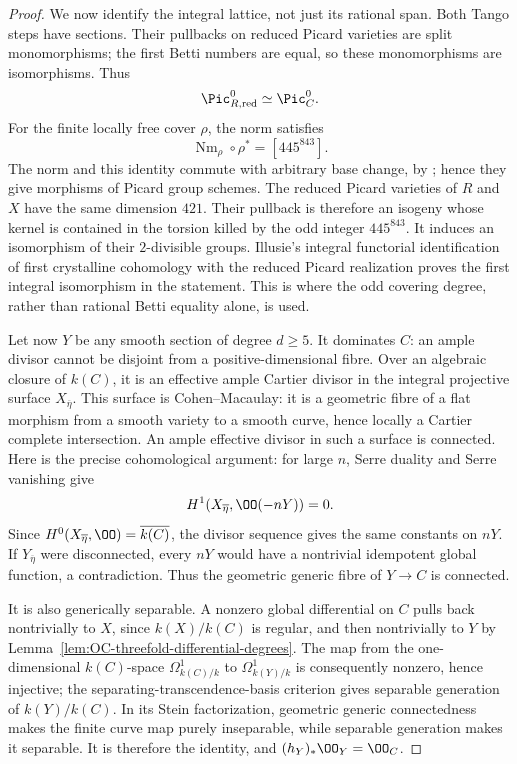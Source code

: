 \begin{proof}
We now identify the integral lattice, not just its rational span.  Both Tango steps have sections.  Their pullbacks on reduced Picard varieties are split monomorphisms; the first Betti numbers are equal, so these monomorphisms are isomorphisms.  Thus
\[
                   \Pic^0_{R,\mathrm{red}}\simeq\Pic^0_C.
\]
For the finite locally free cover $\rho$, the norm satisfies
\[
            \operatorname{Nm}_\rho\circ\rho^*=[445^{843}].
\]
The norm and this identity commute with arbitrary base change, by
\cite[Lemmas~31.18.2 and~31.18.6, Tags~0BCY and~0BD2]{StacksProject}; hence they give morphisms of Picard group schemes.  The reduced Picard varieties of $R$ and $X$ have the same dimension $421$.  Their pullback is therefore an isogeny whose kernel is contained in the torsion killed by the odd integer $445^{843}$.  It induces an isomorphism of their $2$-divisible groups.  Illusie's integral functorial identification of first crystalline cohomology with the reduced Picard realization
\cite[II, Proposition~3.11 and Remark~3.11.2]{Illusie1979DRW}
proves the first integral isomorphism in the statement.  This is where the odd covering degree, rather than rational Betti equality alone, is used.

Let now $Y$ be any smooth section of degree $d\geq5$.  It dominates $C$: an ample divisor cannot be disjoint from a positive-dimensional fibre.  Over an algebraic closure of $k(C)$, it is an effective ample Cartier divisor in the integral projective surface $X_{\overline\eta}$.  This surface is Cohen--Macaulay: it is a geometric fibre of a flat morphism from a smooth variety to a smooth curve, hence locally a Cartier complete intersection.  An ample effective divisor in such a surface is connected.  Here is the precise cohomological argument: for large $n$, Serre duality and Serre vanishing give
\[
               H^1(X_{\overline\eta},\OO(-nY))=0.
\]
Since $H^0(X_{\overline\eta},\OO)=\overline{k(C)}$, the divisor sequence gives the same constants on $nY$.  If $Y_{\overline\eta}$ were disconnected, every $nY$ would have a nontrivial idempotent global function, a contradiction.  Thus the geometric generic fibre of $Y\to C$ is connected.

It is also generically separable.  A nonzero global differential on $C$ pulls back nontrivially to $X$, since $k(X)/k(C)$ is regular, and then nontrivially to $Y$ by Lemma~\ref{lem:OC-threefold-differential-degrees}.  The map from the one-dimensional $k(C)$-space $\Omega^1_{k(C)/k}$ to $\Omega^1_{k(Y)/k}$ is consequently nonzero, hence injective; the separating-transcendence-basis criterion gives separable generation of $k(Y)/k(C)$.  In its Stein factorization, geometric generic connectedness makes the finite curve map purely inseparable, while separable generation makes it separable.  It is therefore the identity, and $(h_Y)_*\OO_Y=\OO_C$.


\end{proof}
